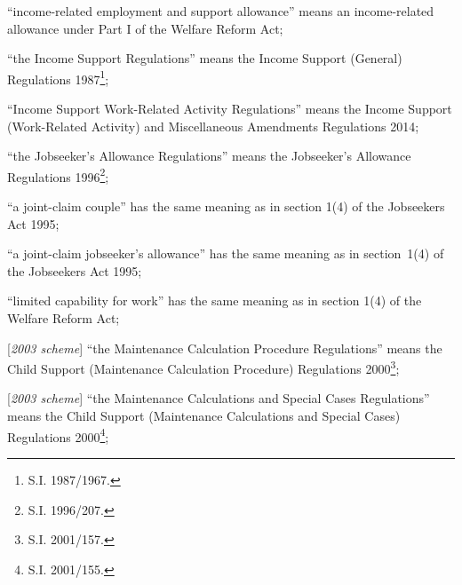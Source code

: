 \documentclass[12pt,a4paper]{article}
\begin{document}
\begin{enumerate}
“income-related employment and support allowance” means an income-related allowance under Part I of the Welfare Reform Act;

“the Income Support Regulations” means the Income Support (General) Regulations 1987\footnote{\frenchspacing S.I. 1987/1967.};

“Income Support Work-Related Activity Regulations” means the Income Support (Work-Related Activity) and Miscellaneous Amendments Regulations 2014;

“the Jobseeker’s Allowance Regulations” means the Jobseeker’s Allowance Regulations 1996\footnote{\frenchspacing S.I. 1996/207.};

“a joint-claim couple” has the same meaning as in section 1(4) of the Jobseekers Act 1995;

    “a joint-claim jobseeker’s allowance” has the same meaning as in section~1(4) of the Jobseekers Act 1995;


“limited capability for work” has the same meaning as in section 1(4) of the Welfare Reform Act;


[\emph{2003 scheme}] “the Maintenance Calculation Procedure Regulations” means the Child Support (Maintenance Calculation Procedure) Regulations 2000\footnote{\frenchspacing S.I. 2001/157.};

[\emph{2003 scheme}] “the Maintenance Calculations and Special Cases Regulations” means the Child Support (Maintenance Calculations and Special Cases) Regulations 2000\footnote{\frenchspacing S.I. 2001/155.};


\end{enumerate}
\end{document}
